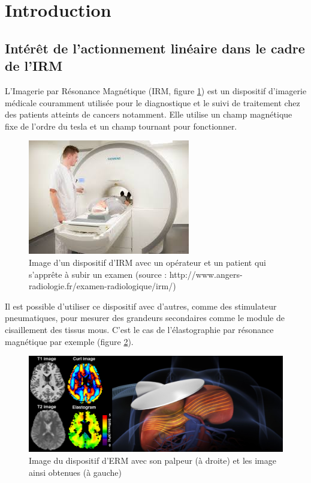 \documentclass[10pt, a4paper]{article}
\begin{document}

\tableofcontents
\newpage

\section{Introduction}
    \subsection{Intérêt de l'actionnement linéaire dans le cadre de l'IRM}
    
    \qquad L'Imagerie par Résonance Magnétique (IRM, figure \ref{fig:IRM}) est un dispositif d'imagerie médicale couramment utilisée pour le diagnostique et le suivi de traitement chez des patients atteints de cancers notamment. Elle utilise un champ magnétique fixe de l'ordre du tesla et un champ tournant pour fonctionner.   \\


\begin{figure}[ht!]
\centering
\includegraphics[scale=1]{ImageIntro/IRM.jpg}
\caption{Image d'un dispositif d'IRM avec un opérateur et un patient qui s'apprête à subir un examen (source : http://www.angers-radiologie.fr/examen-radiologique/irm/) }
\label{fig:IRM}
\end{figure}


    Il est possible d'utiliser ce dispositif avec d'autres, comme des stimulateur pneumatiques, pour mesurer des grandeurs secondaires comme le module de cisaillement des tissus mous. C'est le cas de l'élastographie par résonance magnétique par exemple (figure \ref{fig:ERM}).
    
\begin{figure}[ht!]
\centering
\includegraphics[scale=0.4]{ImageIntro/ERM.png}
\caption{Image du dispositif d'ERM avec son palpeur (à droite) et les image ainsi obtenues (à gauche)}
\label{fig:ERM}
\end{figure}
\end{document}
